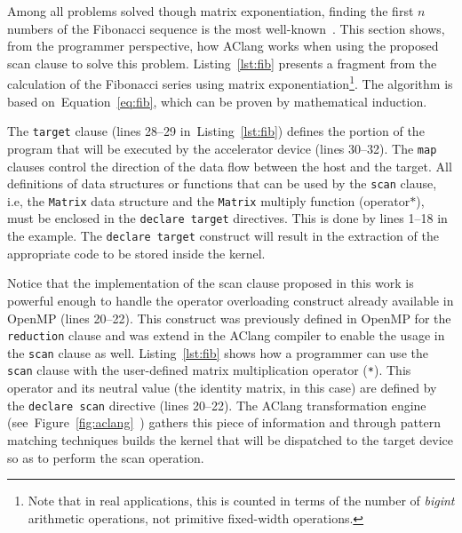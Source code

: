 \documentclass[Ingles]{ic-tese-v1}
\newcommand{\rfig}[1]{Figure~\ref{fig:#1}}
\newcommand{\req}[1]{Equation~\ref{eq:#1}}
\newcommand{\ttt}[1]{{\texttt{#1}}}
\newcommand{\rlst}[1]{Listing~\ref{lst:#1}}
\begin{document}
Among all problems solved though matrix exponentiation, finding the first $n$
numbers of the Fibonacci sequence is the most well-known~\cite{fibonacci}.
This section shows, from the programmer perspective,    how AClang works   when
using the proposed scan clause to solve this problem. \rlst{fib}  presents a
fragment from  the calculation  of the  Fibonacci series  using matrix
exponentiation\footnote{Note  that  in   real  applications,  this  is
	counted in terms of the  number of \textit{bigint} arithmetic operations, not
	primitive  fixed-width  operations.}. The algorithm  is  based  on~\req{fib},
which can be proven by mathematical induction.

The \ttt{target} clause (lines 28--29 in~\rlst{fib}) defines the portion of the
program  that will  be  executed by  the  accelerator device  (lines
30--32).  The \ttt{map}  clauses control the direction  of the data flow
between the host and the  target. All definitions of data structures
or functions  that can be used  by the \ttt{scan} clause,  i.e, the
\ttt{Matrix} data  structure and the \ttt{Matrix}  multiply function
(operator$*$),  must   be  enclosed  in  the   \ttt{declare  target}
directives. This is done by lines 1--18 in the example.  The \ttt{declare  target}
construct  will result in  the extraction of  the appropriate
code to be stored inside the kernel.

Notice that the implementation
of the  scan clause  proposed in  this work  is powerful  enough to
handle  the operator  overloading  construct  already available  in
OpenMP (lines  20--22). This construct was  previously defined in
OpenMP for the \ttt{reduction} clause  and was extend in the AClang
compiler  to enable  the usage  in  the \ttt{scan}  clause as  well.
\rlst{fib} shows how a  programmer can use the \ttt{scan}
clause   with  the   user-defined  matrix   multiplication  operator
(\ttt{*}).   This  operator  and  its neutral  value  (the  identity
matrix,  in  this  case)  are  defined  by  the  \ttt{declare  scan}
directive   (lines  20--22).    The  AClang   transformation  engine
(see~\rfig{aclang}~) gathers  this piece  of information
and through pattern matching techniques  builds the kernel that will
be  dispatched to  the  target  device so  as  to  perform the  scan
operation.
\end{document}

